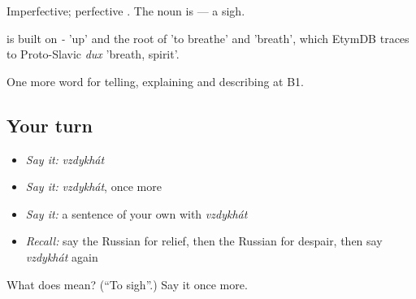 Imperfective; perfective . The noun is \emph{} — a sigh.

\begin{cousinweb}
\emph{} is built on \emph{-} 'up' and the root of \emph{} 'to breathe' and \emph{} 'breath', which EtymDB traces to Proto-Slavic \emph{dux} 'breath, spirit'.
\end{cousinweb}

\begin{grammarlens}[title={What you've built}]
One more word for telling, explaining and describing at B1.
\end{grammarlens}

\subsection*{Your turn}
\begin{itemize}
\raggedright
  \item \emph{Say it:} \emph{vzdykhát}
  \item \emph{Say it:} \emph{vzdykhát}, once more
  \item \emph{Say it:} a sentence of your own with \emph{vzdykhát}
  \item \emph{Recall:} say the Russian for relief, then the Russian for despair, then say \emph{vzdykhát} again
\end{itemize}

\begin{tcolorbox}[breakable,colback=teal!4,colframe=teal!35!black,title={Before you move on}]
What does  mean? (\textquotedblleft{}To sigh\textquotedblright{}.) Say it once more.
\end{tcolorbox}

